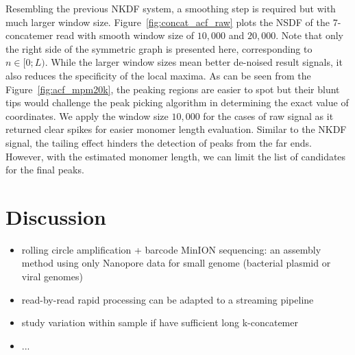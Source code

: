 Resembling the previous NKDF system, a smoothing step is required but with much larger window size. Figure~\ref{fig:concat_acf_raw} plots the NSDF of the 7-concatemer read with smooth window size of $10,000$ and $20,000$. Note that only the right side of the symmetric graph is presented here, corresponding to $n \in [0;L)$.
While the larger window sizes mean better de-noised result signals, it also reduces the specificity of the local maxima. As can be seen from the Figure~\ref{fig:acf_mpm20k}, the peaking regions are easier to spot but their blunt tips would challenge the peak picking algorithm in determining the exact value of coordinates. We apply the window size $10,000$ for the cases of raw signal as it returned clear spikes for easier monomer length evaluation. 
Similar to the NKDF signal, the tailing effect hinders the detection of peaks from the far ends. However, with the estimated monomer length, we can limit the list of candidates for the final peaks. 
\section{Discussion}
\begin{itemize}
    \item rolling circle amplification + barcode MinION sequencing: an assembly method using only Nanopore data for small genome (bacterial plasmid or viral genomes)
    \item read-by-read rapid processing can be adapted to a streaming pipeline
    \item study variation within sample if have sufficient long k-concatemer
    \item ...
\end{itemize}